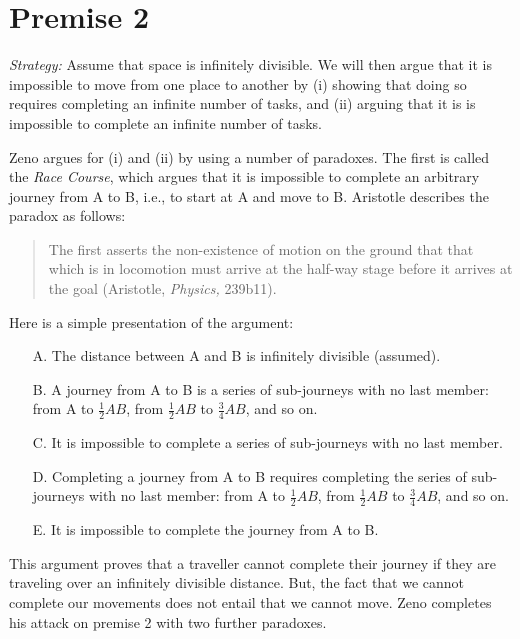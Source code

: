 \documentclass[oneside]{article}
\begin{document}
\section*{Premise 2}\label{premise-2}


\emph{Strategy:} Assume that space is infinitely divisible. We will then argue
that it is impossible to move from one place to another by (i) showing that doing so requires completing an infinite number of tasks, and (ii) arguing that it is
is impossible to complete an infinite number of tasks.

Zeno argues for (i) and (ii) by using a number of paradoxes. The first is
called the \emph{Race Course}, which argues that it is impossible to complete
an arbitrary journey from A to B, i.e., to start at A and move to B. Aristotle describes the paradox as follows:

\begin{quote}
The first asserts the non-existence of motion on the ground that that
which is in locomotion must arrive at the half-way stage before it
arrives at the goal (Aristotle, \emph{Physics,} 239b11).
\end{quote}
Here is a simple presentation of the argument: 
\begin{enumerate}
\item[A.]  The distance between A and B is infinitely divisible (assumed).
\item[B.]  A journey from A to B is a series of sub-journeys with no last member:
  from A to \(\frac{1}{2}AB\), from \(\frac{1}{2}AB\) to
  \(\frac{3}{4}AB\), and so on.
\item[C.]  It is impossible to complete a series of sub-journeys with no last
  member.
\item[D.]  Completing a journey from A to B requires completing the series of
  sub-journeys with no last member: from A to \(\frac{1}{2}AB\), from
  \(\frac{1}{2}AB\) to \(\frac{3}{4}AB\), and so on.
\item[E.]  It is impossible to complete the journey from A to B.
\end{enumerate}
This argument proves that a traveller cannot complete their journey if they are traveling over an infinitely divisible distance. But, the fact that we cannot complete our movements does not entail  that we cannot move. Zeno completes his attack on premise 2 with two further paradoxes. 
\end{document}
